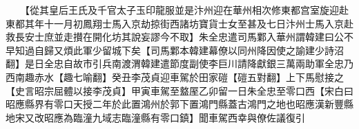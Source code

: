 　　【從其皇后王氏及千官太子玉印龍服並是汴州迎在華州相次修東都宫室旋迎赴東都其年十一月初鳳翔士馬入京劫掠街西諸坊寶貨士女至甚及七日汴州士馬入京赴救長安士庶並走攅在開化坊其說妄謬今不取】朱全忠遣司馬鄴入華州謂韓建曰公不早知過自歸又煩此軍少留城下矣【司馬鄴本韓建幕僚以同州降因使之諭建少詩沼翻】是日全忠自故市引兵南渡渭韓建遣節度副使李巨川請降獻銀三萬兩助軍全忠乃西南趣赤水【趣七喻翻】癸丑李茂貞迎車駕於田家磑【磑五對翻】上下馬慰接之【史言昭宗屈體以接李茂貞】甲寅車駕至盩厔乙卯留一日朱全忠至零口西【宋白曰昭應縣界有零口天授二年於此置鴻州於郭下置鴻門縣蓋古鴻門之地也昭應漢新豐縣地宋又改昭應為臨潼九域志臨潼縣有零口鎮】聞車駕西幸與僚佐議復引